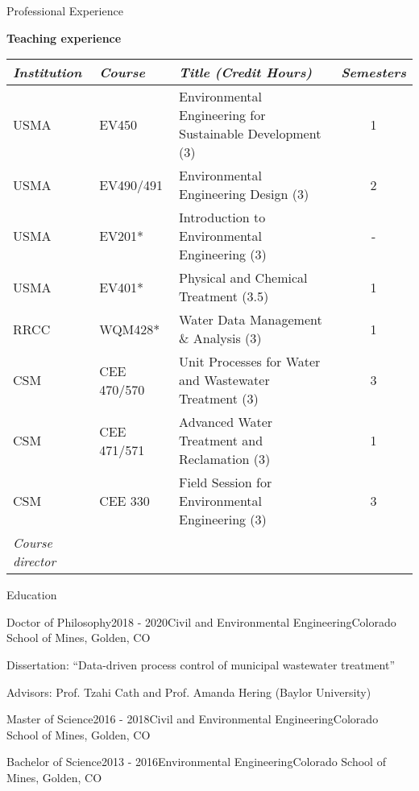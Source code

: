 \documentclass{resume} %
\begin{document}
\begin{rSection}{Professional Experience}
\begin{table}[h]
    \centering
\textbf{Teaching experience}
\begin{tabular}{lllc}
\toprule
  \emph{Institution} & \emph{Course} & \emph{Title (Credit Hours)} & \emph{Semesters}\\
\midrule			
  USMA & EV450 & Environmental Engineering for Sustainable Development (3) & 1 \\
  USMA & EV490/491 & Environmental Engineering Design (3) & 2  \\
  USMA & EV201* & Introduction to Environmental Engineering (3) & -  \\
  USMA & EV401* & Physical and Chemical Treatment (3.5) & 1  \\
  RRCC & WQM428* & Water Data Management \& Analysis (3) & 1 \\
  CSM & CEE 470/570 & Unit Processes for Water and Wastewater Treatment (3) & 3 \\
  CSM & CEE 471/571 & Advanced Water Treatment and Reclamation (3) & 1 \\
  CSM & CEE 330 & Field Session for Environmental Engineering (3) & 3  \\
\bottomrule
{\footnotesize * \emph{Course director}}
\end{tabular}
\end{table}


\end{rSection}


\begin{rSection}{Education}

\begin{rSubsection}{Doctor of Philosophy}{2018 - 2020}{Civil and Environmental Engineering}{Colorado School of Mines, Golden, CO}
\item Dissertation: “Data-driven process control of municipal wastewater treatment”
\item Advisors: Prof. Tzahi Cath and Prof. Amanda Hering (Baylor University)
\end{rSubsection}

\begin{rSubsection}{Master of Science}{2016 - 2018}{Civil and Environmental Engineering}{Colorado School of Mines, Golden, CO}
\end{rSubsection}

\begin{rSubsection}{Bachelor of Science}{2013 - 2016}{Environmental Engineering}{Colorado School of Mines, Golden, CO}
\end{rSubsection}

\end{rSection}
\end{document}
